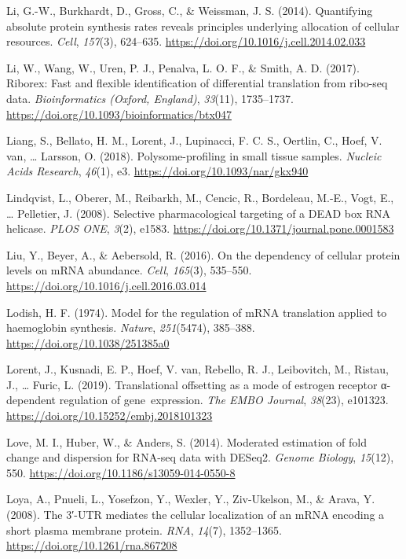 \documentclass[12pt,openany]{book}
\begin{document}
\hypertarget{ref-Li2014}{}
Li, G.-W., Burkhardt, D., Gross, C., \& Weissman, J. S. (2014).
Quantifying absolute protein synthesis rates reveals principles
underlying allocation of cellular resources. \emph{Cell}, \emph{157}(3),
624--635. \url{https://doi.org/10.1016/j.cell.2014.02.033}

\hypertarget{ref-Li2017}{}
Li, W., Wang, W., Uren, P. J., Penalva, L. O. F., \& Smith, A. D.
(2017). Riborex: Fast and flexible identification of differential
translation from ribo-seq data. \emph{Bioinformatics (Oxford, England)},
\emph{33}(11), 1735--1737.
\url{https://doi.org/10.1093/bioinformatics/btx047}

\hypertarget{ref-Liang2018}{}
Liang, S., Bellato, H. M., Lorent, J., Lupinacci, F. C. S., Oertlin, C.,
Hoef, V. van, \ldots{} Larsson, O. (2018). Polysome-profiling in small
tissue samples. \emph{Nucleic Acids Research}, \emph{46}(1), e3.
\url{https://doi.org/10.1093/nar/gkx940}

\hypertarget{ref-Lindqvist2008}{}
Lindqvist, L., Oberer, M., Reibarkh, M., Cencic, R., Bordeleau, M.-E.,
Vogt, E., \ldots{} Pelletier, J. (2008). Selective pharmacological
targeting of a DEAD box RNA helicase. \emph{PLOS ONE}, \emph{3}(2),
e1583. \url{https://doi.org/10.1371/journal.pone.0001583}

\hypertarget{ref-Liu2016}{}
Liu, Y., Beyer, A., \& Aebersold, R. (2016). On the dependency of
cellular protein levels on mRNA abundance. \emph{Cell}, \emph{165}(3),
535--550. \url{https://doi.org/10.1016/j.cell.2016.03.014}

\hypertarget{ref-Lodish1974}{}
Lodish, H. F. (1974). Model for the regulation of mRNA translation
applied to haemoglobin synthesis. \emph{Nature}, \emph{251}(5474),
385--388. \url{https://doi.org/10.1038/251385a0}

\hypertarget{ref-Lorent2019}{}
Lorent, J., Kusnadi, E. P., Hoef, V. van, Rebello, R. J., Leibovitch,
M., Ristau, J., \ldots{} Furic, L. (2019). Translational offsetting as a
mode of estrogen receptor α-dependent regulation of gene~expression.
\emph{The EMBO Journal}, \emph{38}(23), e101323.
\url{https://doi.org/10.15252/embj.2018101323}

\hypertarget{ref-Love2014}{}
Love, M. I., Huber, W., \& Anders, S. (2014). Moderated estimation of
fold change and dispersion for RNA-seq data with DESeq2. \emph{Genome
Biology}, \emph{15}(12), 550.
\url{https://doi.org/10.1186/s13059-014-0550-8}

\hypertarget{ref-Loya2008}{}
Loya, A., Pnueli, L., Yosefzon, Y., Wexler, Y., Ziv-Ukelson, M., \&
Arava, Y. (2008). The 3′-UTR mediates the cellular localization of an
mRNA encoding a short plasma membrane protein. \emph{RNA}, \emph{14}(7),
1352--1365. \url{https://doi.org/10.1261/rna.867208}
\end{document}
